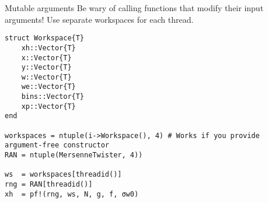 \documentclass{beamer}
\begin{document}
\begin{frame}[fragile]{Mutable arguments}{}
    Be wary of calling functions that modify their input arguments! Use separate workspaces for each thread.
\begin{verbatim}
struct Workspace{T}
    xh::Vector{T}
    x::Vector{T}
    y::Vector{T}
    w::Vector{T}
    we::Vector{T}
    bins::Vector{T}
    xp::Vector{T}
end

workspaces = ntuple(i->Workspace(), 4) # Works if you provide argument-free constructor
RAN = ntuple(MersenneTwister, 4))

ws  = workspaces[threadid()]
rng = RAN[threadid()]
xh  = pf!(rng, ws, N, g, f, σw0)
\end{verbatim}

\end{frame}
\end{document}
